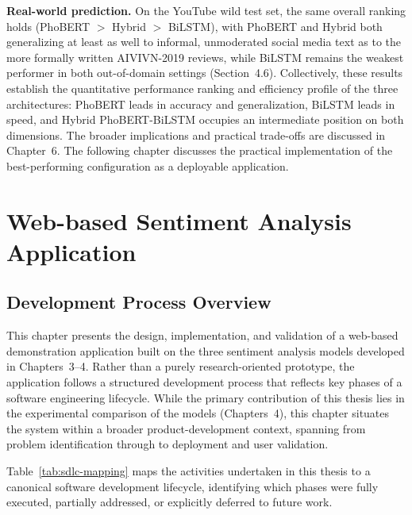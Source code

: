 \documentclass[12pt]{report} %
\begin{document}
\textbf{Real-world prediction.} On the YouTube wild test set, the same overall ranking holds (PhoBERT $>$ Hybrid $>$ BiLSTM), with PhoBERT and Hybrid both generalizing at least as well to informal, unmoderated social media text as to the more formally written AIVIVN-2019 reviews, while BiLSTM remains the weakest performer in both out-of-domain settings (Section~4.6).
Collectively, these results establish the quantitative performance ranking and efficiency profile of the three architectures: PhoBERT leads in accuracy and generalization, BiLSTM leads in speed, and Hybrid PhoBERT-BiLSTM occupies an intermediate position on both dimensions. The broader implications and practical trade-offs are discussed in Chapter~6. The following chapter discusses the practical implementation of the best-performing configuration as a deployable application.




\chapter{Web-based Sentiment Analysis Application}

\section{Development Process Overview}
\label{sec:dev-process}

This chapter presents the design, implementation, and validation of a web-based demonstration application built on the three sentiment analysis models developed in Chapters~3--4. Rather than a purely research-oriented prototype, the application follows a structured development process that reflects key phases of a software engineering lifecycle. While the primary contribution of this thesis lies in the experimental comparison of the models (Chapters~4), this chapter situates the system within a broader product-development context, spanning from problem identification through to deployment and user validation.

Table~\ref{tab:sdlc-mapping} maps the activities undertaken in this thesis to a canonical software development lifecycle, identifying which phases were fully executed, partially addressed, or explicitly deferred to future work.
\end{document}
